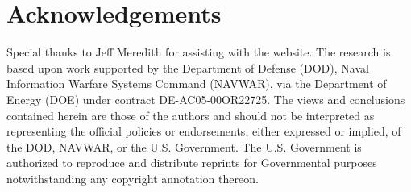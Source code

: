 \section*{Acknowledgements}
Special thanks to Jeff Meredith for assisting with the website. 
The research is based upon work supported by the Department of Defense (DOD), Naval Information Warfare Systems Command (NAVWAR), via the Department of Energy (DOE) under contract  DE-AC05-00OR22725. The views and conclusions contained herein are those of the authors and should not be interpreted as representing the official policies or endorsements, either expressed or implied, of the DOD, NAVWAR, or the U.S. Government. The U.S. Government is authorized to reproduce and distribute reprints for Governmental purposes notwithstanding any copyright annotation thereon. 

